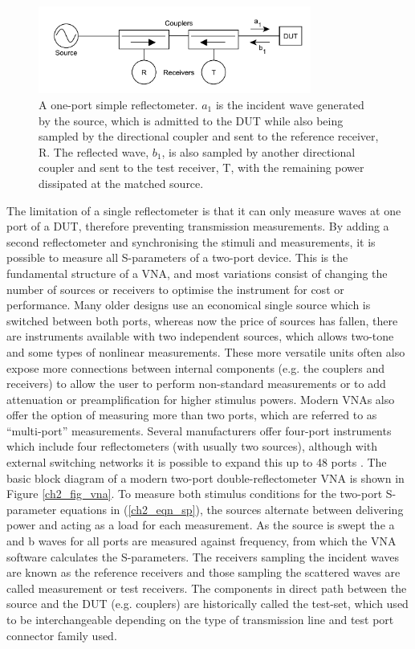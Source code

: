 \documentclass[../thesis/thesis.tex]{subfiles}
\begin{document}
\begin{figure}
	\centering
	\includegraphics[width=0.8\textwidth]{ch2_reflect}
	\caption[Structure of a one-port reflectometer.]{A one-port simple reflectometer. $a_1$ is the incident wave generated by the source, which is admitted to the DUT while also being sampled by the directional coupler and sent to the reference receiver, R. The reflected wave, $b_1$, is also sampled by another directional coupler and sent to the test receiver, T, with the remaining power dissipated at the matched source.}
	\label{ch2_fig_refl}
\end{figure}

The limitation of a single reflectometer is that it can only measure waves at one port of a DUT, therefore preventing transmission measurements. By adding a second reflectometer and synchronising the stimuli and measurements, it is possible to measure all S-parameters of a two-port device. This is the fundamental structure of a VNA, and most variations consist of changing the number of sources or receivers to optimise the instrument for cost or performance. Many older designs use an economical single source which is switched between both ports, whereas now the price of sources has fallen, there are instruments available with two independent sources, which allows two-tone and some types of nonlinear measurements. These more versatile units often also expose more  connections between internal components (e.g. the couplers and receivers) to allow the user to perform non-standard measurements or to add attenuation or preamplification for higher stimulus powers.
Modern VNAs also offer the option of measuring more than two ports, which are referred to as “multi-port” measurements. Several manufacturers offer four-port instruments which include four reflectometers (with usually two sources), although with external switching networks it is possible to expand this up to 48 ports \cite{mj_multiport}.
The basic block diagram of a modern two-port double-reflectometer VNA is shown in Figure \ref{ch2_fig_vna}. To measure both stimulus conditions for the two-port S-parameter equations in (\ref{ch2_eqn_sp}), the sources alternate between delivering power and acting as a load for each measurement. As the source is swept the a and b waves for all ports are measured against frequency, from which the VNA software calculates the S-parameters. The receivers sampling the incident waves are known as the reference receivers and those sampling the scattered waves are called measurement or test receivers. The components in direct path between the source and the DUT (e.g. couplers) are historically called the test-set, which used to be interchangeable depending on the type of transmission line and test port connector family used.
\end{document}
